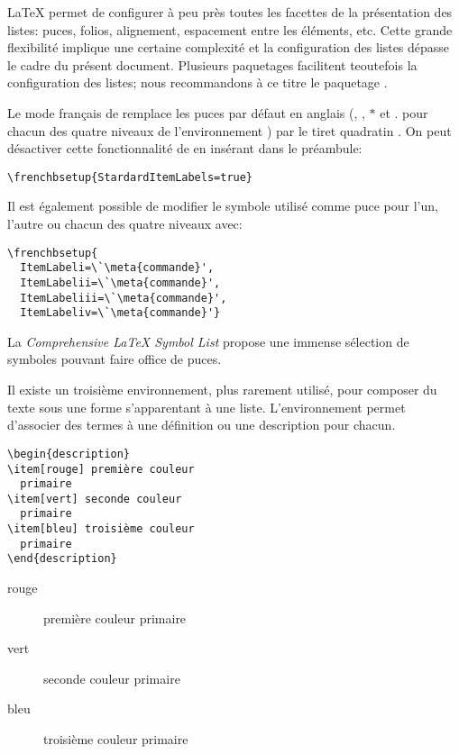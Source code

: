 {\LaTeX} permet de configurer à peu près toutes les facettes de la
présentation des listes: puces, folios, alignement, espacement entre
les éléments, etc. Cette grande flexibilité implique une certaine
complexité et la configuration des listes dépasse le cadre du présent
document. Plusieurs paquetages facilitent teoutefois la configuration
des listes; nous recommandons à ce titre le paquetage 
\citep{enumitem}.

\begin{conseil}
  Le mode français de  remplace les puces par défaut en
  anglais ({\textbullet}, {\textendash}, $\ast$ et $.$ pour chacun
  des quatre niveaux de l'environnement ) par le tiret
  quadratin {\textemdash}. On peut désactiver cette fonctionnalité de
   en insérant dans le préambule:
\begin{lstlisting}
\frenchbsetup{StardardItemLabels=true}
\end{lstlisting}
  Il est également possible de modifier le symbole utilisé comme
  puce pour l'un, l'autre ou chacun des quatre niveaux avec:
\begin{lstlisting}
\frenchbsetup{
  ItemLabeli=\`\meta{commande}',
  ItemLabelii=\`\meta{commande}',
  ItemLabeliii=\`\meta{commande}',
  ItemLabeliv=\`\meta{commande}'}
\end{lstlisting}
  La \emph{Comprehensive {\LaTeX} Symbol List} \citep{comprehensive}
  propose une immense sélection de symboles pouvant faire office de
  puces.
\end{conseil}

Il existe un troisième environnement, plus rarement utilisé, pour
composer du texte sous une forme s'apparentant à une liste.
L'environnement  permet d'associer des termes à une
définition ou une description pour chacun.
\begin{demo}
  \begin{texample}
\begin{lstlisting}
\begin{description}
\item[rouge] première couleur
  primaire
\item[vert] seconde couleur
  primaire
\item[bleu] troisième couleur
  primaire
\end{description}
\end{lstlisting}
    \producing
\begin{description}
\item[rouge] première couleur primaire
\item[vert] seconde couleur primaire
\item[bleu] troisième couleur primaire
\end{description}
  \end{texample}
\end{demo}


